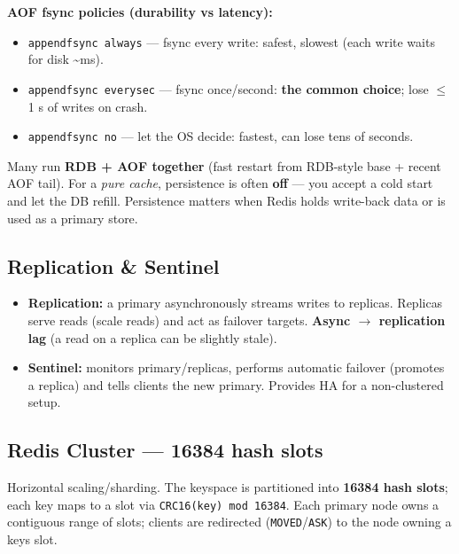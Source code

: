 \documentclass[11pt]{article}
\providecommand{\tightlist}{\setlength{\itemsep}{1pt}\setlength{\parskip}{0pt}}
\begin{document}
\textbf{AOF fsync policies (durability vs latency):}

\begin{itemize}
\tightlist
\item
  \texttt{appendfsync\ always} --- fsync every write: safest, slowest (each write waits for disk \textasciitilde ms).
\item
  \texttt{appendfsync\ everysec} --- fsync once/second: \textbf{the common choice}; lose \(\leq\)1 s of writes on crash.
\item
  \texttt{appendfsync\ no} --- let the OS decide: fastest, can lose tens of seconds.
\end{itemize}

Many run \textbf{RDB + AOF together} (fast restart from RDB-style base + recent AOF tail). For a \emph{pure cache}, persistence is often \textbf{off} --- you accept a cold start and let the DB refill. Persistence matters when Redis holds write-back data or is used as a primary store.

\subsection{Replication \& Sentinel}\label{replication--sentinel}

\begin{itemize}
\tightlist
\item
  \textbf{Replication:} a primary asynchronously streams writes to replicas. Replicas serve reads (scale reads) and act as failover targets. \textbf{Async \(\rightarrow\) replication lag} (a read on a replica can be slightly stale).
\item
  \textbf{Sentinel:} monitors primary/replicas, performs automatic failover (promotes a replica) and tells clients the new primary. Provides HA for a non-clustered setup.
\end{itemize}

\subsection{Redis Cluster --- 16384 hash slots}\label{redis-cluster--16384-hash-slots}

Horizontal scaling/sharding. The keyspace is partitioned into \textbf{16384 hash slots}; each key maps to a slot via \texttt{CRC16(key)\ mod\ 16384}. Each primary node owns a contiguous range of slots; clients are redirected (\texttt{MOVED}/\texttt{ASK}) to the node owning a key\textquotesingle s slot.
\end{document}
